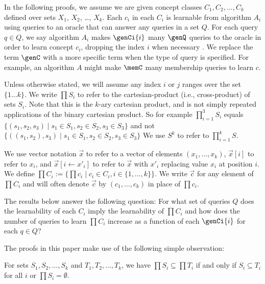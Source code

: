In the following proofs, we assume we are given concept classes $C_1, C_2, \dots, C_k$ defined over sets $X_1$, $X_2$, \dots, $X_k$. 
Each $c_i$ in each $C_i$ is learnable from algorithm $A_i$ using queries to an oracle that can answer any queries in a set $Q$.  
For each query $q \in Q$, we say algorithm $A_i$ makes $\genCi{i}$ many $\genQ$ queries to the oracle in order to learn concept $c_i$, dropping the index $i$ when necessary .
We replace the term $\genC$ with a more specific term when the type of query is specified.
For example, an algorithm $A$ might make $\memC$ many membership queries to learn $c$. 

Unless otherwise stated, we will assume any index $i$ or $j$ ranges over the set $\{ 1 \dots k \}$.
We write $\prod S_i$ to refer to the cartesian-product (i.e., cross-product) of sets $S_i$. 
Note that this is the $k$-ary cartesian product, and is not simply repeated applications of the binary cartesian product.
So for example $\prod_{i=1}^3 S_i$ equals $\{ (s_1, s_2, s_3) \mid s_1 \in S_1, s_2 \in S_2, s_3 \in S_3 \}$ and not $\{ ((s_1, s_2), s_3) \mid s_1 \in S_1, s_2 \in S_2, s_3 \in S_3 \}$
We use $S^k$ to refer to $\prod_{i=1}^k S$. 

We use vector notation $\vec{x}$ to refer to a vector of elements $(x_1,\dots, x_k)$, $\vec{x}[i]$ to refer to $x_i$, and $\vec{x}[i \leftarrow x'_i]$ to refer to $\vec{x}$ with $x'_i$ replacing value $x_i$ at position $i$. 
We define $\prod C_i := \{ \prod c_i \mid c_i \in C_i, i \in \{1,\dots,k\} \}$. 
We write $\vec{c}$ for any element of $\prod C_i $ and will often denote $\vec{c}$ by $(c_1, \dots, c_k)$ in place of $\prod c_i$. 

The results below answer the following question:
For what set of queries $Q$ does the learnability of each $C_i$ imply the learnability of $\prod C_i $ and how does the number of queries to learn $\prod C_i $ increase as a function of each $\genCi{i}$ for each $q \in Q$?

The proofs in this paper make use of the following simple observation:
\begin{observation}
\label{subobs}
For sets $S_1, S_2, \dots, S_k$ and $T_1, T_2, \dots, T_k$, we have $\prod S_i \subseteq \prod T_i$ if and only if $S_i \subseteq T_i$ for all $i$ or $\prod S_i = \emptyset$.
\end{observation}
